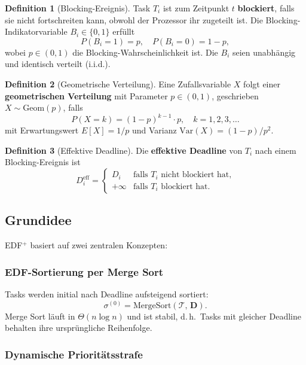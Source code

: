 ﻿\documentclass[a4paper,12pt]{article}
\theoremstyle{definition}
\newtheorem{definition}{Definition}
\begin{document}
	\begin{definition}[Blocking-Ereignis]
		Task $T_i$ ist zum Zeitpunkt $t$ \textbf{blockiert}, falls sie nicht
		fortschreiten kann, obwohl der Prozessor ihr zugeteilt ist. Die Blocking-Indikatorvariable $B_i \in \{0,1\}$ erfüllt
		\[
		P(B_i = 1) = p, \quad P(B_i = 0) = 1-p,
		\]
		wobei $p \in (0,1)$ die Blocking-Wahrscheinlichkeit ist. Die $B_i$ seien
		unabhängig und identisch verteilt (i.i.d.).
	\end{definition}
	
	\begin{definition}[Geometrische Verteilung]
		Eine Zufallsvariable $X$ folgt einer \textbf{geometrischen Verteilung} mit
		Parameter $p \in (0,1)$, geschrieben $X \sim \mathrm{Geom}(p)$, falls
		\[
		P(X = k) = (1-p)^{k-1} \cdot p, \quad k = 1, 2, 3, \ldots
		\]
		mit Erwartungswert $E[X] = 1/p$ und Varianz $\mathrm{Var}(X) = (1-p)/p^2$.
	\end{definition}
	
	\begin{definition}[Effektive Deadline]
		Die \textbf{effektive Deadline} von $T_i$ nach einem Blocking-Ereignis ist
		\[
		D_i^{\text{eff}} = \begin{cases}
			D_i & \text{falls } T_i \text{ nicht blockiert hat,} \\
			+\infty & \text{falls } T_i \text{ blockiert hat.}
		\end{cases}
		\]
	\end{definition}
	
	\subsection{Grundidee}
	
	EDF$^+$ basiert auf zwei zentralen Konzepten:
	
	\subsubsection{EDF-Sortierung per Merge Sort}
	
	Tasks werden initial nach Deadline aufsteigend sortiert:
	\[
	\sigma^{(0)} = \mathrm{MergeSort}(\mathcal{T},\, \mathbf{D}).
	\]
	Merge Sort läuft in $\Theta(n \log n)$ und ist stabil, d.\,h.\ Tasks mit
	gleicher Deadline behal\-ten ihre ursprüngliche Reihenfolge.
	
	\subsubsection{Dynamische Prioritätsstrafe}
	
\end{document}
